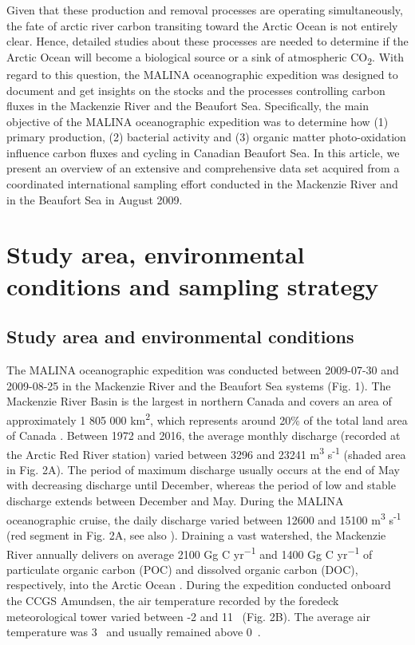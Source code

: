 \documentclass[essd, manuscript]{copernicus}
\begin{document}
Given that these production and removal processes are operating simultaneously, the fate of arctic river carbon transiting toward the Arctic Ocean is not entirely clear. Hence, detailed studies about these processes are needed to determine if the Arctic Ocean will become a biological source or a sink of atmospheric CO\textsubscript{2}. With regard to this question, the MALINA oceanographic expedition was designed to document and get insights on the stocks and the processes controlling carbon fluxes in the Mackenzie River and the Beaufort Sea. Specifically, the main objective of the MALINA oceanographic expedition was to determine how (1) primary production, (2) bacterial activity and (3) organic matter photo-oxidation influence carbon fluxes and cycling in Canadian Beaufort Sea. In this article, we present an overview of an extensive and comprehensive data set acquired from a coordinated international sampling effort conducted in the Mackenzie River and in the Beaufort Sea in August 2009.

\section{Study area, environmental conditions and sampling strategy}

\subsection{Study area and environmental conditions}

The MALINA oceanographic expedition was conducted between 2009-07-30 and 2009-08-25 in the Mackenzie River and the Beaufort Sea systems (Fig. 1). The Mackenzie River Basin is the largest in northern Canada and covers an area of approximately 1 805 000 km\textsuperscript{2}, which represents around 20\% of the total land area of Canada \citep{AbdulAziz2006}. Between 1972 and 2016, the average monthly discharge (recorded at the Arctic Red River station) varied between 3296 and 23241 m\textsuperscript{3} s\textsuperscript{-1} (shaded area in Fig. 2A). The period of maximum discharge usually occurs at the end of May with decreasing discharge until December, whereas the period of low and stable discharge extends between December and May. During the MALINA oceanographic cruise, the daily discharge varied between 12600 and 15100 m\textsuperscript{3} s\textsuperscript{-1} (red segment in Fig. 2A, see also \citet{Ehn2019}). Draining a vast watershed, the Mackenzie River annually delivers on average 2100 Gg C yr\textsuperscript{−1} and 1400 Gg C yr\textsuperscript{−1} of particulate organic carbon (POC) and dissolved organic carbon (DOC), respectively,  into the Arctic Ocean \citep{Stein2004, Raymond2007}. During the expedition conducted onboard the CCGS Amundsen, the air temperature recorded by the foredeck meteorological tower varied between -2 and 11~\textcelsius{} (Fig. 2B). The average air temperature was  3~\textcelsius{} and usually remained above 0~\textcelsius{}.
\end{document}
